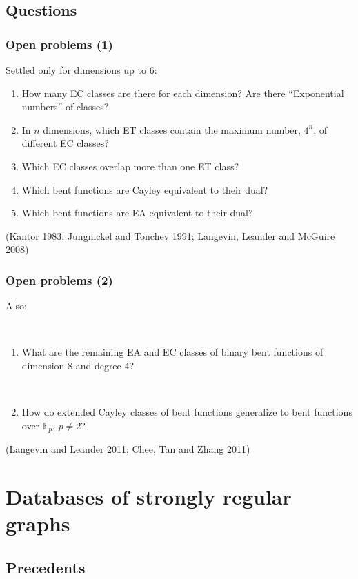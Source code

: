 \documentclass[pdf,sprung,slideColor,nocolorBG]{beamer}
\newenvironment{colortheme}[1]{
\def\ProvidesPackageRCS $##1${\relax}
\renewcommand{\ProcessOptions}{\relax}
\makeatletter

\makeatother
}{}
\newcommand{\slidecite}[1]{\tiny{(#1)}\normalsize{}}
\newcommand{\mb}[1]{\mathbb{#1}}
\newcommand{\F}{\mb{F}}
\begin{document}
\subsection{Questions}

\begin{colortheme}{jubata}

\begin{frame}
\frametitle{Open problems (1)}
Settled only for dimensions up to 6:
\begin{enumerate}
\item
How many EC classes are there for each dimension?
Are there ``Exponential numbers'' of classes?
\item
In $n$ dimensions,
which ET classes contain the maximum number, $4^n$, of different EC classes?
\item
Which EC classes overlap more than one ET class?
\item
Which bent functions are Cayley equivalent to their dual?
\item
Which bent functions are EA equivalent to their dual?
\end{enumerate}

\slidecite{Kantor 1983; Jungnickel and Tonchev 1991; Langevin, Leander and McGuire 2008}
\end{frame}

\begin{frame}
\frametitle{Open problems (2)}
Also:

~

\begin{enumerate}
\item
What are the remaining EA and EC classes of binary bent functions of dimension 8 and degree 4?

~

\item
How do extended Cayley classes of bent functions generalize to bent functions over $\F_p$, $p \neq 2$?
\end{enumerate}

\slidecite{Langevin and Leander 2011; Chee, Tan and Zhang 2011}
\end{frame}

\end{colortheme}

\section{Databases of strongly regular graphs}

\subsection{Precedents}
\end{document}
